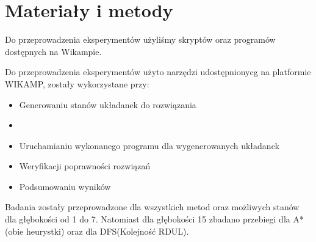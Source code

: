 \documentclass{classrep}
\begin{document}
    \section{Materiały i metody}
    {
        Do przeprowadzenia eksperymentów użyliśmy skryptów oraz programów dostępnych na Wikampie.

        Do przeprowadzenia eksperymentów użyto narzędzi udostępnionycg na platformie WIKAMP,
        zostały wykorzystane przy:
        \begin{itemize}
            \item Generowaniu stanów układanek do rozwiązania
            \item \item Uruchamianiu wykonanego programu dla wygenerowanych układanek
            \item Weryfikacji poprawności rozwiązań
            \item Podsumowaniu wyników
        \end{itemize}
        Badania zostały przeprowadzone dla wszystkich metod oraz możliwych stanów dla
        głębokości od 1 do 7. Natomiast dla głębokości 15 zbadano przebiegi dla A*(obie heurystki)
        oraz dla DFS(Kolejność RDUL).
    }\label{sec:materiay-i-metody}
\end{document}
